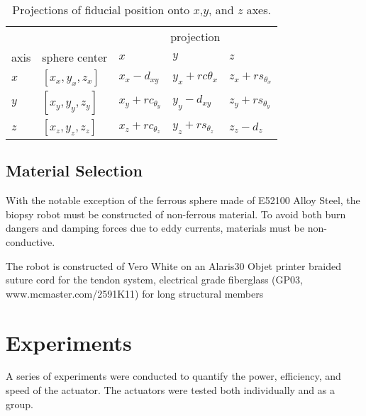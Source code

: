 \documentclass[letterpaper, 10 pt]{IEEEtran}
\begin{document}
\begin{table}[h]
\begin{tabular}{ll | lll}
         &                & \multicolumn{3}{c}{projection} \\
axis & sphere center		     & $x$        & $y$        & $z$     \\ \hline  
$x$        &      $[x_x,y_x,z_x]$          &     $x_x - d_{xy}$     &    $y_x+r c{\theta_x}$      &    $z_x+r s_{\theta_x}$          \\
$y$        &      $[x_y,y_y,z_y]$           &     $x_y+r c_{\theta_y}$        &     $y_y - d_{xy}$     &     $z_y+r s_{\theta_y}$         \\
\rowcolor{light-gray} $z$        &       $[x_z,y_z,z_z]$          &     $x_z+r c_{\theta_z}$        &     $y_z+r s_{\theta_z}$         &    $z_z - d_{z}$     
\end{tabular}
\caption{Projections of fiducial position onto $x$,$y$, and $z$ axes.}
\label{tab:actuatorprojections}
\end{table}




\subsection{Material Selection}

With the notable exception of the ferrous sphere made of E52100 Alloy Steel, the biopsy robot must be constructed of non-ferrous material.  To avoid both burn dangers and damping forces due to eddy currents, materials must be non-conductive.

The robot is constructed of  Vero White %
 on an Alaris30 Objet printer %
braided  suture cord for the tendon system, 
 electrical grade fiberglass (GP03, www.mcmaster.com/2591K11) for long structural members

    

\section{Experiments}\label{sec:Experiments}
    A series of experiments were conducted to quantify the power, efficiency, and speed of the actuator.  The actuators were tested both individually and as a group.
    
\end{document}
